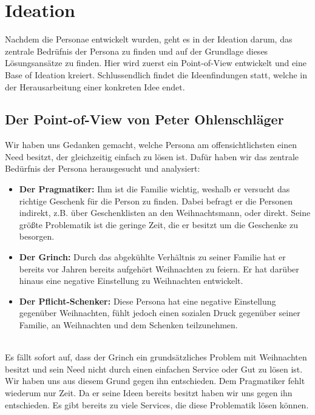 \documentclass[12pt,ngerman, fleqn]{book} %
\begin{document}
\chapter{Ideation}
\setcounter{page}{11}

Nachdem die Personae entwickelt wurden, geht es in der Ideation darum, das zentrale Bedrüfnis der Persona zu finden und auf der Grundlage dieses Lösungsansätze zu finden. Hier wird zuerst ein Point-of-View entwickelt und eine Base of Ideation kreiert. Schlussendlich findet die Ideenfindungen statt, welche in der Herausarbeitung einer konkreten Idee endet.\\

\section{Der Point-of-View von Peter Ohlenschläger}
Wir haben uns Gedanken gemacht, welche Persona am offensichtlichsten einen Need besitzt, der gleichzeitig einfach zu lösen ist. Dafür haben wir das zentrale Bedürfnis der Persona herausgesucht und analysiert:

\begin{itemize}
    \item \textbf{Der Pragmatiker:} Ihm ist die Familie wichtig, weshalb er versucht das richtige Geschenk für die Person zu finden. Dabei befragt er die Personen indirekt, z.B. über Geschenklisten an den Weihnachtsmann, oder direkt. Seine größte Problematik ist die geringe Zeit, die er besitzt um die Geschenke zu besorgen.
    \item \textbf{Der Grinch:} Durch das abgekühlte Verhältnis zu seiner Familie hat er bereits vor Jahren bereits aufgehört Weihnachten zu feiern. Er hat darüber hinaus eine negative Einstellung zu Weihnachten entwickelt.
    \item \textbf{Der Pflicht-Schenker:} Diese Persona hat eine negative Einstellung gegenüber Weihnachten, fühlt jedoch einen sozialen Druck gegenüber seiner Familie, an Weihnachten und dem Schenken teilzunehmen.\\\\
\end{itemize}
Es fällt sofort auf, dass der Grinch ein grundsätzliches Problem mit Weihnachten besitzt und sein Need nicht durch einen einfachen Service oder Gut zu lösen ist. Wir haben uns aus diesem Grund gegen ihn entschieden. Dem Pragmatiker fehlt wiederum nur Zeit. Da er seine Ideen bereits besitzt haben wir uns gegen ihn entschieden. Es gibt bereits zu viele Services, die diese Problematik lösen können.
\end{document}
